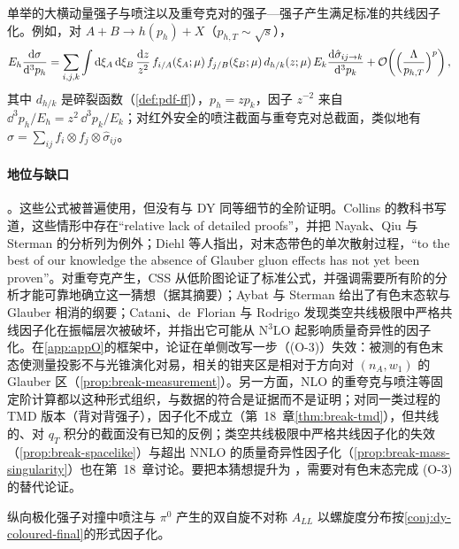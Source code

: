 \begin{conjecture}\label{conj:dy-coloured-final}
单举的大横动量强子与喷注以及重夸克对的强子—强子产生满足标准的共线因子化。例如，对 $A+B\to h(p_h)+X$（$p_{h,T}\sim\sqrt s$），
\[
E_h\frac{\mathrm{d}\sigma}{\mathrm{d}^3p_h}=\sum_{i,j,k}\int\mathrm{d}\xi_A\,\mathrm{d}\xi_B\,\frac{\mathrm{d} z}{z^2}\,f_{i/A}(\xi_A;\mu)\,f_{j/B}(\xi_B;\mu)\,d_{h/k}(z;\mu)\,E_k\frac{\mathrm{d}\hat\sigma_{ij\to k}}{\mathrm{d}^3p_k}+\mathcal{O}\!\left(\Big(\frac{\Lambda}{p_{h,T}}\Big)^{p}\right),
\]
其中 $d_{h/k}$ 是碎裂函数（\cref{def:pdf-ff}），$p_h=zp_k$，因子 $z^{-2}$ 来自 $\dd^3p_h/E_h=z^2\,\dd^3p_k/E_k$；对红外安全的喷注截面与重夸克对总截面，类似地有 $\sigma=\sum_{ij}f_i\otimes f_j\otimes\hat\sigma_{ij}$。
\end{conjecture}

\paragraph{地位与缺口}\tagC。这些公式被普遍使用，但没有与 DY 同等细节的全阶证明。Collins 的教科书写道，这些情形中存在“relative lack of detailed proofs”，并把 Nayak、Qiu 与 Sterman 的分析\cite{NayakQiuSterman2005b}列为例外\cite[第~14.7~节，第~570--571~页]{Collins2011}；Diehl 等人指出，对末态带色的单次散射过程，“to the best of our knowledge the absence of Glauber gluon effects has not yet been proven”\cite[第~5~节]{Diehl:2015bca}。对重夸克产生，CSS 从低阶图论证了标准公式，并强调需要所有阶的分析才能可靠地确立这一猜想\cite{Collins:1985gm}（据其摘要）；Aybat 与 Sterman 给出了有色末态软与 Glauber 相消的纲要\cite{AybatSterman2009}；Catani、de~Florian 与 Rodrigo 发现类空共线极限中严格共线因子化在振幅层次被破坏，并指出它可能从 N$^3$LO 起影响质量奇异性的因子化\cite[第~8~节]{CataniDeFlorianRodrigo2012}。在\cref{app:appO}的框架中，论证在单侧改写一步（(O-3)）失效：被测的有色末态使测量投影不与光锥演化对易，相关的钳夹区是相对于方向对 $(n_A,w_1)$ 的 Glauber 区（\cref{prop:break-measurement}）。另一方面，NLO 的重夸克\cite{NasonDawsonEllis1988}与喷注\cite{Kang:2016mcy}等固定阶计算都以这种形式组织，与数据的符合是证据而不是证明；对同一类过程的 TMD 版本（背对背强子），因子化不成立（第~18~章\cref{thm:break-tmd}），但共线的、对 $q_T$ 积分的截面没有已知的反例；类空共线极限中严格共线因子化的失效（\cref{prop:break-spacelike}）与超出 NNLO 的质量奇异性因子化（\cref{prop:break-mass-singularity}）也在第~18~章讨论。要把本猜想提升为 \tagA，需要对有色末态完成 (O-3) 的替代论证。

\begin{conjecture}\label{conj:dy-polarized-jets}
纵向极化强子对撞中喷注与 $\pi^0$ 产生的双自旋不对称 $A_{LL}$ 以螺旋度分布按\cref{conj:dy-coloured-final}的形式因子化。
\end{conjecture}

